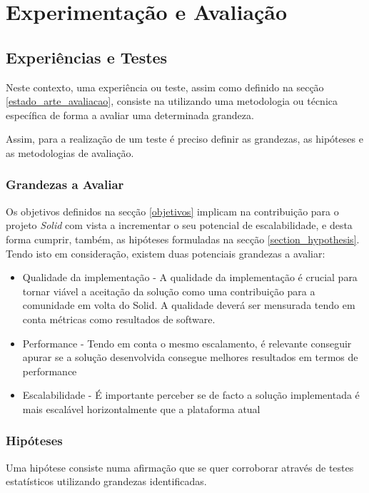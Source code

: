 
\chapter{Experimentação e Avaliação}
\label{cap:6}

\section{Experiências e Testes}
Neste contexto, uma experiência ou teste, assim como definido na secção \ref{estado_arte_avaliacao}, consiste na utilizando uma metodologia ou técnica específica de forma a avaliar uma determinada grandeza.

Assim, para a realização de um teste é preciso definir as grandezas, as hipóteses e as metodologias de avaliação.

\subsection{Grandezas a Avaliar}
Os objetivos definidos na secção \ref{objetivos} implicam na contribuição para o projeto \emph{Solid} com vista a incrementar o seu potencial de escalabilidade, e desta forma cumprir, também, as hipóteses formuladas na secção \ref{section_hypothesis}. Tendo isto em consideração, existem duas potenciais grandezas a avaliar:
\begin{itemize}
    \item Qualidade da implementação - A qualidade da implementação é crucial para tornar viável a aceitação da solução como uma contribuição para a comunidade em volta do Solid. A qualidade deverá ser mensurada tendo em conta métricas como resultados de software.
    \item Performance - Tendo em conta o mesmo escalamento, é relevante conseguir apurar se a solução desenvolvida consegue melhores resultados em termos de performance
    \item Escalabilidade - É importante perceber se de facto a solução implementada é mais escalável horizontalmente que a plataforma atual
\end{itemize}

\subsection{Hipóteses \label{avaliacao_experimentacao_hypothesis}}
Uma hipótese consiste numa afirmação que se quer corroborar através de testes estatísticos utilizando grandezas identificadas.

